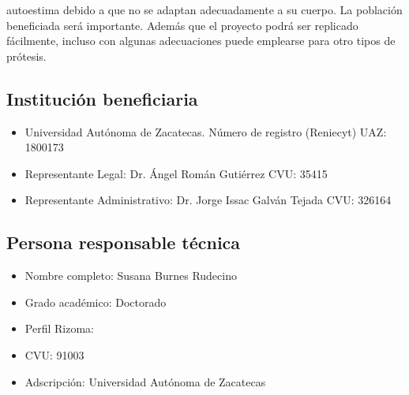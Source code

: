 \documentclass[12pt,a4paper]{article}
\begin{document}
autoestima debido a que no se adaptan adecuadamente a su cuerpo. La población beneficiada será importante. Además que el proyecto podrá ser replicado fácilmente, incluso con algunas adecuaciones puede emplearse para otro tipos de prótesis.  

\subsection{Institución beneficiaria}
\begin{itemize}
    \item Universidad Autónoma de Zacatecas. Número de registro (Reniecyt) UAZ: 1800173
    \item Representante Legal: Dr. Ángel Román Gutiérrez CVU: 35415
    \item Representante Administrativo: Dr. Jorge Issac Galván Tejada CVU: 326164
\end{itemize}


\subsection{Persona responsable técnica}
\begin{itemize}
    \item Nombre completo: Susana Burnes Rudecino 
    \item Grado académico: Doctorado
    \item Perfil Rizoma: 
    \item CVU: 91003
    \item Adscripción: Universidad Autónoma de Zacatecas
\end{itemize}

\end{document}
